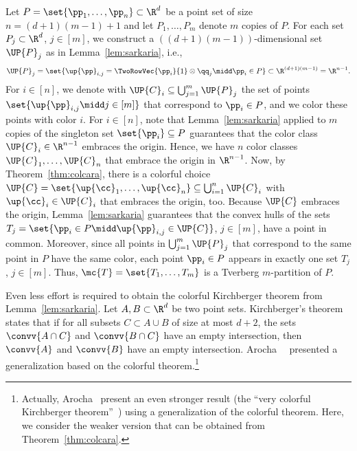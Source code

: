 \begin{prf}\label{thm:tverberg:proof}
Let $P = \set{\pp_1,\dots,\pp_n} \subset \R^d$ be a point set of size
$n=(d+1)(m-1)+1$ and let $P_1,\dots,P_m$ denote $m$ copies of $P$.
For each set $P_j \subset \R^d$, $j \in [m]$, we construct a $((d+1)
(m-1))$-dimensional set $\UP{P}_j$ as in Lemma~\ref{lem:sarkaria}, i.e.,
\[
  \UP{P}_j = \set{ \up{\pp}_{i,j} = 
  \TwoRowVec{\pp_i}{1} \otimes \qq_j \midd \pp_i \in P}
  \subset \R^{(d+1) (m-1)} = \R^{n-1}.
\]
For $i \in [n]$, we denote with 
$\UP{C}_i \subseteq \bigcup_{j=1}^m \UP{P}_j$
the set of points $\set{\up{\pp}_{i,j}  \midd j \in [m]}$ that 
correspond to $\pp_i \in P$,
and we color these points with color $i$. For $i \in [n]$, note that
Lemma~\ref{lem:sarkaria} applied to $m$ copies of the singleton set 
$\set{\pp_i}
\subseteq P$ guarantees that the color class $\UP{C}_i \in
\R^{n-1}$ embraces the origin. Hence, we have $n$ color classes
$\UP{C}_1,\dots,\UP{C}_n$ that embrace the origin in $\R^{n-1}$. Now,
by Theorem~\ref{thm:colcara}, there is a
colorful choice $\UP{C} = \set{\up{\cc}_1,\dots,\up{\cc}_n} \subseteq
\bigcup_{i=1}^n \UP{C}_i$ with $\up{\cc}_i \in \UP{C}_i$ that embraces the
origin, too. Because $\UP{C}$ embraces the origin,
Lemma~\ref{lem:sarkaria} guarantees that the convex hulls of the sets 
$T_j = \set{ \pp_i \in P \midd \up{\pp}_{i,j} \in \UP{C}}$, $j \in [m]$, 
have a point in common.
Moreover, since all points in $\bigcup_{j=1}^m \UP{P}_j$
that correspond to the same point in $P$ have the same
color, each point $\pp_i \in P$ appears in exactly one set 
$T_j$, $j \in [m]$.
Thus, $\mc{T} =\set{T_1,\dots, T_m}$ is a Tverberg $m$-partition of $P$.
\end{prf}

Even less effort is required to obtain the colorful Kirchberger theorem 
from Lemma~\ref{lem:sarkaria}. Let $A, B \subset\R^d$ be two point sets.
Kirchberger's theorem~\cite{Kirchberger1903} states that if for all 
subsets $C \subset A \cup B$ of size at most $d+2$,
the sets $\convv{A\cap C}$ and $\convv{B \cap C}$ have an empty 
intersection, then $\convv{A}$ and $\convv{B}$ have an empty intersection.
Arocha~\etal~\cite{ArochaBaBrFaMo2009} presented a generalization based 
on the colorful \Caratheodory theorem.\footnote{Actually, Arocha~\etal 
present an even stronger result (the ``very colorful Kirchberger
theorem''~\cite[Theorem~3]{ArochaBaBrFaMo2009}) using a generalization 
of the colorful \Caratheodory theorem. Here, we consider the weaker 
version that can be obtained from Theorem~\ref{thm:colcara}.}

